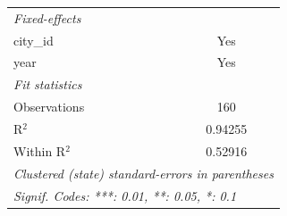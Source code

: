 \begin{tabular}{lc}
   \emph{Fixed-effects}\\
   city\_id            & Yes\\  
   year                & Yes\\  
   \midrule
   \emph{Fit statistics}\\
   Observations        & 160\\  
   R$^2$               & 0.94255\\  
   Within R$^2$        & 0.52916\\  
   \midrule \midrule
   \multicolumn{2}{l}{\emph{Clustered (state) standard-errors in parentheses}}\\
   \multicolumn{2}{l}{\emph{Signif. Codes: ***: 0.01, **: 0.05, *: 0.1}}\\
\end{tabular}
\par\endgroup


